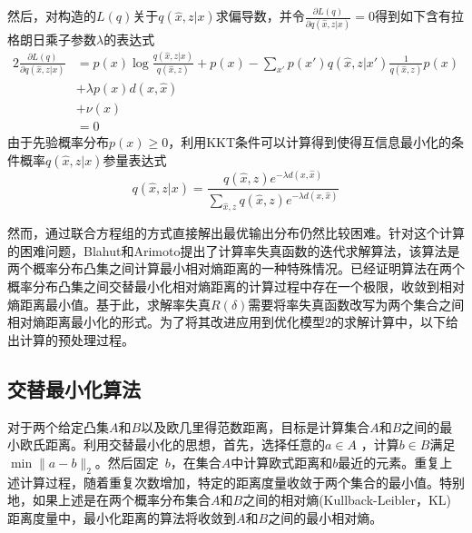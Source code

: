 然后，对构造的$L(q)$关于$q(\hat{x},z|x)$求偏导数，并令$\frac{\partial L(q)}{\partial q(\hat{x},z|x)}=0$得到如下含有拉格朗日乘子参数$\lambda$的表达式
\begin{alignat}{2}
	\frac{\partial L(q)}{\partial q(\hat{x},z|x)} & =p(x)\log \frac{q(\hat{x},z|x)}{q(\hat{x},z)}+p(x)
	-\sum_{x'}p(x')q(\hat{x},z|x')\frac{1}{q(\hat{x},z)}p(x) \nonumber \\
	 & + \lambda p(x)d(x,\hat{x}) \\
	& +\nu (x) \nonumber \\
	& = 0 \nonumber
\end{alignat}
由于先验概率分布$p(x)\geq 0$，利用KKT条件可以计算得到使得互信息最小化的条件概率$q(\hat{x},z|x)$参量表达式
\begin{equation}\label{eq:chapter05-pdf}
	q(\hat{x},z|x)=\frac{q(\hat{x},z)e^{-\lambda d(x,\hat{x})}}{\sum_{\hat{x},z}q(\hat{x},z)e^{-\lambda d(x,\hat{x})}}
\end{equation}

然而，通过联合方程组的方式直接解出最优输出分布仍然比较困难。针对这个计算的困难问题，Blahut和Arimoto\cite{arimoto1972an,blahut1972computation}提出了计算率失真函数的迭代求解算法，该算法是两个概率分布凸集之间计算最小相对熵距离的一种特殊情况\cite{cover2006elements}。已经证明算法在两个概率分布凸集之间交替最小化相对熵距离的计算过程中存在一个极限，收敛到相对熵距离最小值。基于此，求解率失真$R(\delta)$需要将率失真函数改写为两个集合之间相对熵距离最小化的形式。为了将其改进应用到优化模型$2$的求解计算中，以下给出计算的预处理过程。

\subsection{交替最小化算法}
对于两个给定凸集$A$和$B$以及欧几里得范数距离，目标是计算集合$A$和$B$之间的最小欧氏距离。利用交替最小化的思想，首先，选择任意的$a \in A$ ，计算$b \in B$满足~$\min \parallel a-b\parallel_{2}$。然后固定~$b$，在集合$A$中计算欧式距离和$b$最近的元素。重复上述计算过程，随着重复次数增加，特定的距离度量收敛于两个集合的最小值\cite{cover2006elements}。特别地，如果上述是在两个概率分布集合$A$和$B$之间的相对熵(Kullback-Leibler，KL) 距离度量中，最小化距离的算法将收敛到$A$和$B$之间的最小相对熵\cite{csiszar1984information}。

